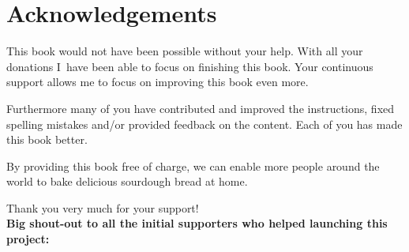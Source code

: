 \chapter{Acknowledgements}%
\label{ch:Acknowledgements}
This book would not have been possible without your help.
With all your donations I~have been able to focus on finishing
this book. Your continuous support allows me to focus
on improving this book even more.

Furthermore many of you have contributed and improved the
instructions, fixed spelling mistakes and/or provided
feedback on the content. Each of you has made this book
better.

By providing this book free of charge,
we can enable more people around the world to bake delicious sourdough
bread at home.

Thank you very much for your support!\\

\textbf{Big shout-out to all the initial supporters who helped launching this
project:\\}


